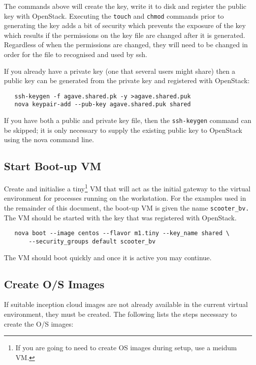 The commands above will create the key, write it to disk and register the public key with OpenStack.
Executing the \verb!touch! and \verb!chmod! commands prior to generating the key adds a bit of security which prevents the exposure of the key
which results if the permissions on the key file are changed after it is generated.
Regardless of when the permissions are changed, they will need to be changed in order for the file to recognised and used by ssh.

If you already have a private key (one that several users might share) then a public key can be generated from the private key and registered with OpenStack:

\small\begin{verbatim}
   ssh-keygen -f agave.shared.pk -y >agave.shared.puk
   nova keypair-add --pub-key agave.shared.puk shared

\end{verbatim}\normalsize

If you have both a public and private key file, then the \verb!ssh-keygen! command can be skipped; it is only necessary to supply the existing public key to
OpenStack using the nova command line.

\subsection{Start Boot-up VM}
Create and initialise a tiny\footnote{If you are going to need to create OS images during setup, use a meidum VM.}
VM that will act as the initial gateway to the virtual environment for processes running on the workstation.
For the examples used in the remainder of this document, the boot-up VM is given the name \verb!scooter_bv.!
The VM should be started with the key that was registered with OpenStack.

\small\begin{verbatim}
   nova boot --image centos --flavor m1.tiny --key_name shared \
       --security_groups default scooter_bv
\end{verbatim}\normalsize

\noindent
The VM should boot quickly and once it is active you may continue.

\subsection{Create O/S Images}
If suitable inception cloud images are not already available in the current virtual environment, they must be created.
The following lists the steps necessary to create the O/S images:

